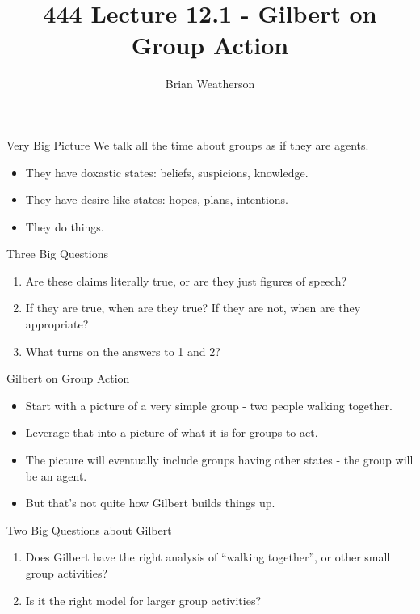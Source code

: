 \documentclass[
  ignorenonframetext,
]{beamer}
\title{444 Lecture 12.1 - Gilbert on Group Action}
\author{Brian Weatherson}
\date{}
\providecommand{\tightlist}{%
  \setlength{\itemsep}{0pt}\setlength{\parskip}{0pt}}
\begin{document}
\frame{\titlepage}

\begin{frame}{Very Big Picture}
\protect\hypertarget{very-big-picture}{}
We talk all the time about groups as if they are agents.

\begin{itemize}[<+->]
\tightlist
\item
  They have doxastic states: beliefs, suspicions, knowledge.
\item
  They have desire-like states: hopes, plans, intentions.
\item
  They do things.
\end{itemize}
\end{frame}

\begin{frame}{Three Big Questions}
\protect\hypertarget{three-big-questions}{}
\begin{enumerate}
\tightlist
\item
  Are these claims literally true, or are they just figures of speech?
\item
  If they are true, when are they true? If they are not, when are they
  appropriate?
\item
  What turns on the answers to 1 and 2?
\end{enumerate}
\end{frame}

\begin{frame}{Gilbert on Group Action}
\protect\hypertarget{gilbert-on-group-action}{}
\begin{itemize}
\tightlist
\item
  Start with a picture of a very simple group - two people walking
  together.
\item
  Leverage that into a picture of what it is for groups to act.
\item
  The picture will eventually include groups having other states - the
  group will be an agent.
\item
  But that's not quite how Gilbert builds things up.
\end{itemize}
\end{frame}

\begin{frame}{Two Big Questions about Gilbert}
\protect\hypertarget{two-big-questions-about-gilbert}{}
\begin{enumerate}
\tightlist
\item
  Does Gilbert have the right analysis of ``walking together'', or other
  small group activities?
\item
  Is it the right model for larger group activities?
\end{enumerate}
\end{frame}
\end{document}
